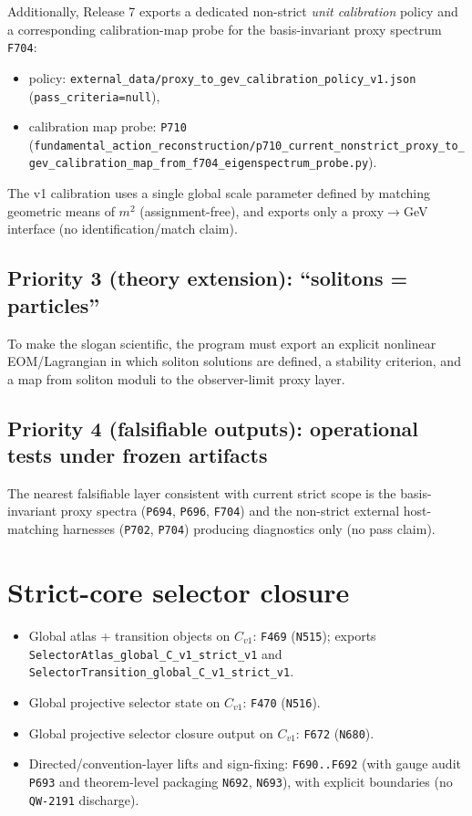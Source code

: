 \documentclass[11pt,a4paper]{article}
\makeatletter
\newcommand{\chapter}{\@ifstar{\section*}{\section}}
\makeatother
\begin{document}
Additionally, Release 7 exports a dedicated non-strict \emph{unit calibration} policy and a corresponding calibration-map probe for the basis-invariant proxy spectrum \texttt{F704}:
\begin{itemize}
  \item policy: \texttt{external\_data/proxy\_to\_gev\_calibration\_policy\_v1.json} (\texttt{pass\_criteria=null}),
  \item calibration map probe: \texttt{P710} (\verb|fundamental_action_reconstruction/p710_current_nonstrict_proxy_to_gev_calibration_map_from_f704_eigenspectrum_probe.py|).
\end{itemize}
The v1 calibration uses a single global scale parameter defined by matching geometric means of $m^2$ (assignment-free), and exports only a proxy$\to$GeV interface (no identification/match claim).

\subsection*{Priority 3 (theory extension): “solitons = particles”}

To make the slogan scientific, the program must export an explicit nonlinear EOM/Lagrangian in which soliton solutions are defined, a stability criterion, and a map from soliton moduli to the observer-limit proxy layer.

\subsection*{Priority 4 (falsifiable outputs): operational tests under frozen artifacts}

The nearest falsifiable layer consistent with current strict scope is the basis-invariant proxy spectra (\texttt{P694}, \texttt{P696}, \texttt{F704}) and the non-strict external host-matching harnesses (\texttt{P702}, \texttt{P704}) producing diagnostics only (no pass claim).

\appendix
\chapter{Export map: key artifacts}
\section{Strict-core selector closure}

\begin{itemize}
  \item Global atlas + transition objects on $C_{v1}$: \texttt{F469} (\texttt{N515}); exports \texttt{SelectorAtlas\_global\_C\_v1\_strict\_v1} and \texttt{SelectorTransition\_global\_C\_v1\_strict\_v1}.
  \item Global projective selector state on $C_{v1}$: \texttt{F470} (\texttt{N516}).
  \item Global projective selector closure output on $C_{v1}$: \texttt{F672} (\texttt{N680}).
  \item Directed/convention-layer lifts and sign-fixing: \texttt{F690..F692} (with gauge audit \texttt{P693} and theorem-level packaging \texttt{N692}, \texttt{N693}), with explicit boundaries (no \texttt{QW-2191} discharge).
\end{itemize}
\end{document}
